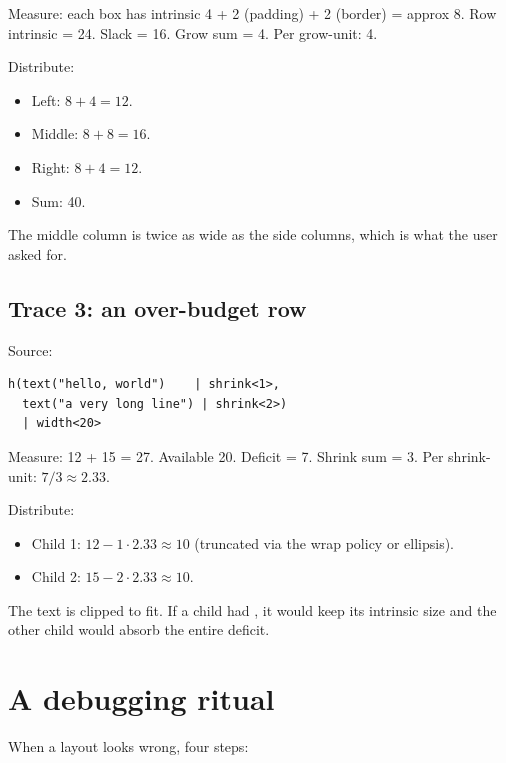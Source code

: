Measure: each box has intrinsic 4 + 2 (padding) + 2 (border) =
approx 8. Row intrinsic = 24. Slack = 16. Grow sum = 4. Per
grow-unit: 4.

Distribute:

\begin{itemize}[leftmargin=*]
  \item Left:   $8 + 4 = 12$.
  \item Middle: $8 + 8 = 16$.
  \item Right:  $8 + 4 = 12$.
  \item Sum: 40. \checkmark
\end{itemize}

The middle column is twice as wide as the side columns, which is
what the user asked for.

\subsection*{Trace 3: an over-budget row}

Source:

\begin{lstlisting}
h(text("hello, world")    | shrink<1>,
  text("a very long line") | shrink<2>)
  | width<20>
\end{lstlisting}

Measure: 12 + 15 = 27. Available 20. Deficit = 7. Shrink sum = 3.
Per shrink-unit: $7 / 3 \approx 2.33$.

Distribute:

\begin{itemize}[leftmargin=*]
  \item Child 1: $12 - 1 \cdot 2.33 \approx 10$ (truncated
    via the wrap policy or ellipsis).
  \item Child 2: $15 - 2 \cdot 2.33 \approx 10$.
\end{itemize}

The text is clipped to fit. If a child had , it
would keep its intrinsic size and the other child would absorb
the entire deficit.

\section{A debugging ritual}

When a layout looks wrong, four steps:

